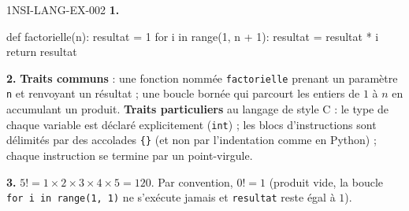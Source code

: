 \begin{corrige}{1NSI-LANG-EX-002}
\textbf{1.}
\begin{python}
def factorielle(n):
    resultat = 1
    for i in range(1, n + 1):
        resultat = resultat * i
    return resultat
\end{python}

\textbf{2.} \textbf{Traits communs} : une fonction nommée \lstinline{factorielle} prenant
un paramètre \lstinline{n} et renvoyant un résultat ; une boucle bornée qui parcourt les
entiers de $1$ à $n$ en accumulant un produit. \textbf{Traits particuliers} au langage de
style C : le type de chaque variable est déclaré explicitement (\lstinline{int}) ; les
blocs d'instructions sont délimités par des accolades \lstinline|{}| (et non par
l'indentation comme en Python) ; chaque instruction se termine par un point-virgule.

\textbf{3.} $5!=1\times2\times3\times4\times5=120$. Par convention, $0!=1$ (produit vide,
la boucle \lstinline{for i in range(1, 1)} ne s'exécute jamais et \lstinline{resultat}
reste égal à $1$).
\end{corrige}
